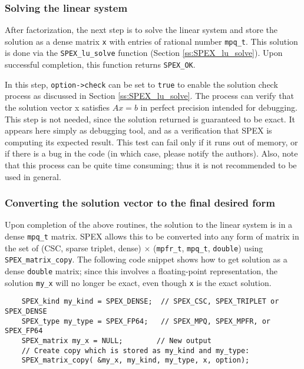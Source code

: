 \documentclass[12pt]{report}
\theoremstyle{definition}
\begin{document}
\subsubsection{Solving the linear system}

After factorization, the next step is to solve the linear system and store the
solution as a dense matrix \verb|x| with entries of rational number
\verb|mpq_t|. This solution is done via the \verb|SPEX_lu_solve|
function (Section \ref{ss:SPEX_lu_solve}). 
Upon successful completion, this function returns \verb|SPEX_OK|.

In this step, \verb|option->check| can be set to \verb|true| to enable the
solution check process as discussed in Section \ref{ss:SPEX_lu_solve}.  The
process can verify that the solution vector x satisfies $Ax=b$ in perfect
precision intended for debugging.  This step is not needed, since the solution
returned is guaranteed to be exact.   It appears here simply as debugging tool,
and as a verification that SPEX is computing its expected result.  This test
can fail only if it runs out of memory, or if there is a bug in the code (in
which case, please notify the authors).  Also, note that this process can be
quite time consuming; thus it is not recommended to be used in general.

\subsubsection{Converting the solution vector to the final desired form}

Upon completion of the above routines, the solution to the linear system is in
a dense \verb|mpq_t| matrix. SPEX allows this to be converted into any form
of matrix in the set of (CSC, sparse triplet, dense) $\times$ (\verb|mpfr_t|,
\verb|mpq_t|, \verb|double|) using \verb|SPEX_matrix_copy|. The following code
snippet shows how to get solution as a dense \verb|double| matrix; since this
involves a floating-point representation, the solution \verb|my_x| will no
longer be exact, even though \verb|x| is the exact solution.

{\small
\begin{verbatim}
    SPEX_kind my_kind = SPEX_DENSE;  // SPEX_CSC, SPEX_TRIPLET or SPEX_DENSE
    SPEX_type my_type = SPEX_FP64;   // SPEX_MPQ, SPEX_MPFR, or SPEX_FP64
    SPEX_matrix my_x = NULL;        // New output
    // Create copy which is stored as my_kind and my_type:
    SPEX_matrix_copy( &my_x, my_kind, my_type, x, option);\end{verbatim} }
\end{document}
